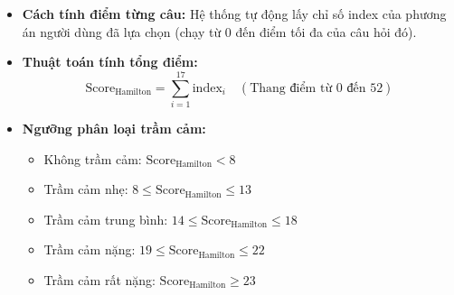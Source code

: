 \documentclass[12pt,a4paper]{article}
\begin{document}
\begin{itemize}
\begin{enumerate}
        \item \textbf{Lo âu tâm lý} (Tăng lo âu, căng thẳng, cáu gắt): 0 (Không), 1 (Căng thẳng nhẹ), 2 (Lo lắng viển vông về tương lai), 3 (Thường xuyên bứt rứt sợ hãi), 4 (Cơn hoảng loạn sợ hãi cực độ).
        \item \textbf{Lo âu thể chất} (Các triệu chứng cơ thể như khó tiêu, tim đập nhanh, đau đầu, khó thở): 0 (Không), 1 (Nhẹ), 2 (Vừa), 3 (Nặng), 4 (Mất khả năng sinh hoạt vì triệu chứng).
        \item \textbf{Triệu chứng cơ thể - dạ dày và ruột} (Mất sự ngon miệng, nặng bụng, táo bón): 0 (Không), 1 (Nhẹ), 2 (Nặng).
        \item \textbf{Triệu chứng cơ thể chung} (Nặng nề tay chân, đầu, đau lưng, mệt mỏi rã rời): 0 (Không), 1 (Có biểu hiện mệt mỏi nhẹ), 2 (Cảm thấy mệt mỏi, bất lực cực độ).
        \item \textbf{Triệu chứng sinh dục} (Giảm ham muốn tình dục, rối loạn kinh nguyệt ở nữ): 0 (Không), 1 (Nhẹ), 2 (Mất ham muốn hoàn toàn).
        \item \textbf{Nghi ngờ mắc bệnh} (Lo sợ bị bệnh nặng, quá chú ý cơ thể): 0 (Không), 1 (Hơi lo lắng quá mức), 2 (Quá bận tâm về sức khỏe), 3 (Thường xuyên than vãn), 4 (Hoang tưởng nghi bệnh).
        \item \textbf{Sút cân} (Sút cân trong thời gian ngắn): 0 (Không), 1 (Sút cân nhẹ), 2 (Sút cân nhiều).
        \item \textbf{Nhận thức ý thức bệnh} (Nhận thức được mình đang mắc bệnh tâm lý): 0 (Nhận thức đầy đủ), 1 (Nhận thức một phần hoặc không rõ), 2 (Phủ nhận hoàn toàn tình trạng bệnh).
    \end{enumerate}
    \item \textbf{Cách tính điểm từng câu:} Hệ thống tự động lấy chỉ số index của phương án người dùng đã lựa chọn (chạy từ 0 đến điểm tối đa của câu hỏi đó).
    \item \textbf{Thuật toán tính tổng điểm:}
    \begin{equation}
        \text{Score}_{\text{Hamilton}} = \sum_{i=1}^{17} \text{index}_i \quad (\text{Thang điểm từ } 0 \text{ đến } 52)
    \end{equation}
    \item \textbf{Ngưỡng phân loại trầm cảm:}
    \begin{itemize}
        \item Không trầm cảm: $\text{Score}_{\text{Hamilton}} < 8$
        \item Trầm cảm nhẹ: $8 \le \text{Score}_{\text{Hamilton}} \le 13$
        \item Trầm cảm trung bình: $14 \le \text{Score}_{\text{Hamilton}} \le 18$
        \item Trầm cảm nặng: $19 \le \text{Score}_{\text{Hamilton}} \le 22$
        \item Trầm cảm rất nặng: $\text{Score}_{\text{Hamilton}} \ge 23$
    \end{itemize}
\end{itemize}
\end{document}
